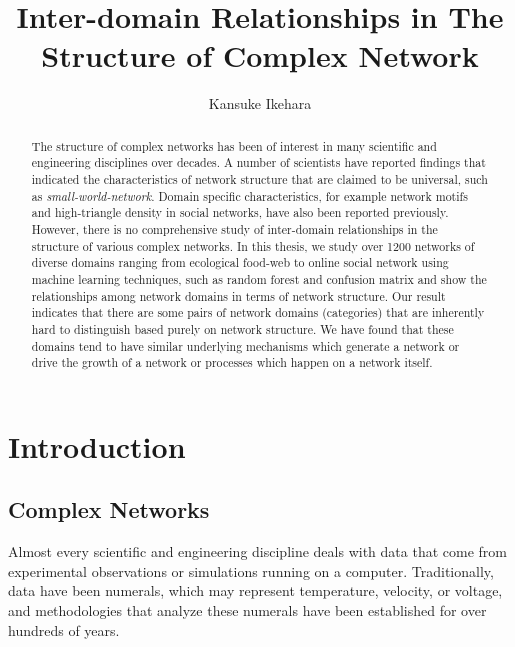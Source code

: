 \documentclass{article}
\begin{document}
\title{Inter-domain Relationships in The Structure of Complex Network}
\author{Kansuke Ikehara}
\maketitle

\begin{abstract}
The structure of complex networks has been of interest in many scientific and engineering disciplines over decades. A number of scientists have reported findings that indicated the characteristics of network structure that are claimed to be universal, such as \textit{small-world-network}. Domain specific characteristics, for example network motifs and high-triangle density in social networks, have also been reported previously. However, there is no comprehensive study of inter-domain relationships in the structure of various complex networks. In this thesis, we study over 1200 networks of diverse domains ranging from ecological food-web to online social network using machine learning techniques, such as random forest and confusion matrix and show the relationships among network domains in terms of network structure. Our result indicates that there are some pairs of network domains (categories) that are inherently hard to distinguish based purely on network structure. We have found that these domains tend to have similar underlying mechanisms which generate a network or drive the growth of a network or processes which happen on a network itself.

\end{abstract}
\tableofcontents


\section{Introduction}
	\subsection{Complex Networks}
	Almost every scientific and engineering discipline deals with data that come from experimental observations or simulations running on a computer. Traditionally, data have been numerals, which may represent temperature, velocity, or voltage, and methodologies that analyze these numerals have been established for over hundreds of years. 
	
\end{document}

